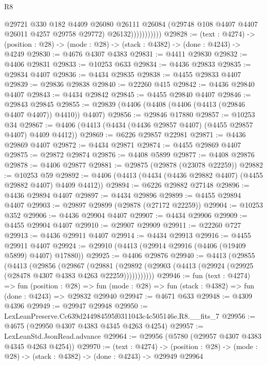 \begin{lexlean}{R8}
\begin{coremodule}
                        @29721
                          @330
                          @182
                          @4409
                          @26080
                          @26111
                          @26084
                          (@29748 @108 @4407 @4407 @26011 @4257 @29758 @29772)
                          @26132)))))))))))
@29828 := (text : @4274) ->
  (position : @28) -> (mode : @28) -> (stack : @4382) -> (done : @4243) -> @4249
@29830 := @4676 @4307 @4383
@29831 := @4411 @29830
@29832 := @4406 @29831
@29833 := @10253 @633
@29834 := @4436 @29833
@29835 := @29834 @4407
@29836 := @4434 @29835
@29838 := @4455 @29833 @4407
@29839 := @29836 @29838
@29840 := @22260 @415
@29842 := @4436 @29840 @4407
@29843 := @4434 @29842
@29845 := @4455 @29840 @4407
@29846 := @29843 @29845
@29855 := @29839 (@4406 (@4408 (@4406 (@4413 (@29846 @4407 @4407)) @4410)) @4407)
@29856 := @29846 @17880
@29857 := @10253 @34
@29867 := @4406 (@4413 (@4434 (@4436 @29857 @4407) (@4455 @29857 @4407) @4409 @4412))
@29869 := @6226 @29857 @22981
@29871 := @4436 @29869 @4407
@29872 := @4434 @29871
@29874 := @4455 @29869 @4407
@29875 := @29872 @29874
@29876 := @4408 @5899
@29877 := @4408 @29876
@29878 := @4406 @29877
@29881 := @29875 (@29878 (@23078 @22259))
@29882 := @10253 @59
@29892 := @4406 (@4413 (@4434 (@4436 @29882 @4407) (@4455 @29882 @4407) @4409 @4412))
@29894 := @6226 @29882 @27148
@29896 := @4436 @29894 @4407
@29897 := @4434 @29896
@29899 := @4455 @29894 @4407
@29903 := @29897 @29899 (@29878 (@27172 @22259))
@29904 := @10253 @352
@29906 := @4436 @29904 @4407
@29907 := @4434 @29906
@29909 := @4455 @29904 @4407
@29910 := @29907 @29909
@29911 := @22260 @727
@29913 := @4436 @29911 @4407
@29914 := @4434 @29913
@29916 := @4455 @29911 @4407
@29924 := @29910 (@4413 (@29914 @29916 (@4406 (@19409 @5899) @4407) @17880))
@29925 := @4406 @29876
@29940 := @4413
    (@29855
      (@4413
        (@29856
          (@29867
            (@29881
              (@29892 (@29903 (@4413 (@29924 (@29925 (@28478 @4307 @4383 @4263 @22259)))))))))))
@29946 := fun (text : @4274) =>
  fun (position : @28) =>
  fun (mode : @28) => fun (stack : @4382) => fun (done : @4243) => @29832 @29940
@29947 := @4671 @633
@29948 := @4309 @4396
@29949 := @29947 @29948
@29950 := LexLeanPreserve.Cc639d244984595f0311043c4c505146e.R8.__fits_7
@29956 := @4675 (@29950 @4307 @4383 @4345 @4263 @4254)
@29957 := LexLeanStd.JsonRead.advance
@29964 := @29956 (@5780 (@29957 @4307 @4383 @4345 @4263 @4254))
@29970 := (text : @4274) ->
  (position : @28) -> (mode : @28) -> (stack : @4382) -> (done : @4243) -> @29949 @29964

\end{coremodule}
\end{lexlean}
